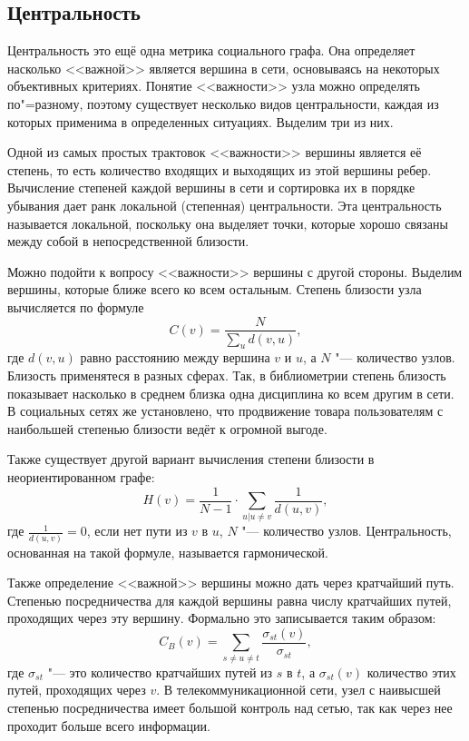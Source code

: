 \subsection{Центральность}
Центральность это ещё одна метрика социального графа. Она определяет насколько  <<важной>> является вершина в сети, основываясь на некоторых объективных критериях.\cite{hansen2010analyzing} Понятие <<важности>> узла можно определять по"=разному, поэтому существует несколько видов центральности, каждая из которых применима в определенных ситуациях. Выделим три из них.

Одной из самых простых трактовок <<важности>> вершины является её степень, то есть количество входящих и выходящих из этой вершины ребер. Вычисление степеней каждой вершины в сети и сортировка их в порядке убывания дает ранк локальной (степенная) центральности. Эта центральность называется локальной, поскольку она выделяет точки, которые хорошо связаны между собой в непосредственной близости.\cite{scott2012social}

Можно подойти к вопросу <<важности>> вершины с другой стороны. Выделим вершины, которые ближе всего ко всем остальным. Степень близости узла вычисляется по формуле
\begin{equation*}
    C(v) = \frac{N}{\sum_u{d(v,u)}},
\end{equation*}
где $d(v,u)$ равно расстоянию между вершина $v$ и $u$, а $N$ "--- количество узлов. Близость применятеся в разных сферах. Так, в библиометрии степень близость показывает насколько в среднем близка одна дисциплина ко всем другим в сети.\cite{bibliometrics} В социальных сетях же установлено, что продвижение товара пользователям с наибольшей степенью близости ведёт к огромной выгоде.\cite{closeness_marketing}

Также существует другой вариант вычисления степени близости в неориентированном графе:
\begin{equation*}
    H(v) = \frac{1}{N - 1} \cdot  \sum_{u\vert u \neq v}{\frac{1}{d(u,v)}},
\end{equation*}
где $\frac{1}{d(u,v)} = 0$, если нет пути из $v$ в $u$, $N$ "--- количество узлов. Центральность, основанная на такой формуле, называется гармонической.

Также определение <<важной>> вершины можно дать через кратчайший путь. Степенью посредничества для каждой вершины равна числу кратчайших путей, проходящих через эту вершину. Формально это записывается таким образом:
\begin{equation*}
    C_B(v) = \sum_{s \neq u \neq t }{\frac{\sigma_{st}(v) }{\sigma_{st}}},
\end{equation*}
где $\sigma_{st}$ "--- это количество кратчайших путей из $s$ в $t$, а $\sigma_{st}(v)$ количество этих путей, проходящих через $v$. В телекоммуникационной сети, узел с наивысшей степенью посредничества имеет большой контроль над сетью, так как через нее проходит больше всего информации.

